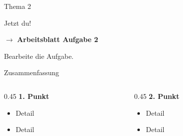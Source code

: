 \documentclass[aspectratio=169, 11pt]{beamer}
\newcommand{\abmark}[1]{{\Large$\rightarrow$ \textbf{Arbeitsblatt Aufgabe #1}}}
\begin{document}

\begin{frame}{Thema 2}
    \vspace{0.3cm}


\end{frame}

\begin{frame}{Jetzt du!}
    \vspace{1cm}

    \begin{center}
        \abmark{2}

        \vspace{1cm}

        {\large Bearbeite die Aufgabe.}
    \end{center}
\end{frame}


\begin{frame}{Zusammenfassung}
    \vspace{0.3cm}

    \begin{columns}[T]
        \begin{column}{0.45\textwidth}
            \textbf{1. Punkt}

            \begin{itemize}
                \item Detail
                \item Detail
            \end{itemize}
        \end{column}

        \begin{column}{0.45\textwidth}
            \textbf{2. Punkt}

            \begin{itemize}
                \item Detail
                \item Detail
            \end{itemize}
        \end{column}
    \end{columns}
\end{frame}
\end{document}
